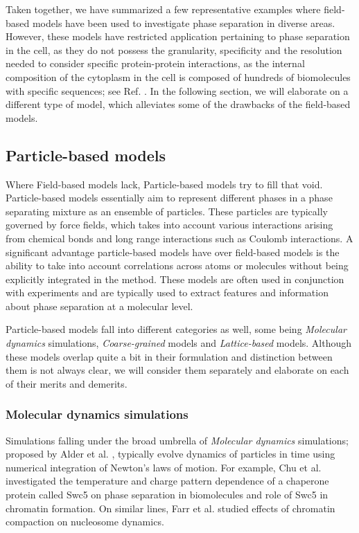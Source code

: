 Taken together, we have summarized a few representative examples where field-based models have been used to investigate phase separation in diverse areas. 
However, these models have restricted application pertaining to phase separation in the cell, as they do not possess the granularity, specificity and the resolution needed to consider specific protein-protein interactions, as the internal composition of the cytoplasm in the cell is composed of hundreds of biomolecules with specific sequences; see Ref. \cite{Burla2019}.
In the following section, we will elaborate on a different type of model, which alleviates some of the drawbacks of the field-based models. 

\subsection{Particle-based models}

Where Field-based models lack, Particle-based models try to fill that void.
Particle-based models essentially aim to represent different phases in a phase separating mixture as an ensemble of particles.
These particles are typically governed by force fields, which takes into account various interactions arising from chemical bonds and long range interactions such as Coulomb interactions.
A significant advantage particle-based models have over field-based models is the ability to take into account correlations across atoms or molecules without being explicitly integrated in the method.
These models are often used in conjunction with experiments and are typically used to extract features and information about phase separation at a molecular level.

Particle-based models fall into different categories as well, some being \textit{Molecular dynamics} simulations, \textit{Coarse-grained} models and \textit{Lattice-based} models.
Although these models overlap quite a bit in their formulation and distinction between them is not always clear, we will consider them separately and elaborate on each of their merits and demerits. 

\subsubsection{Molecular dynamics simulations}

Simulations falling under the broad umbrella of \textit{Molecular dynamics} simulations; proposed by Alder et al. \cite{Alder1959}, typically evolve dynamics of particles in time using numerical integration of Newton's laws of motion.
For example, Chu et al. \cite{Chu2021} investigated the temperature and charge pattern dependence of a chaperone protein called Swc5 on phase separation in biomolecules and role of Swc5 in chromatin formation.
On similar lines, Farr et al. \cite{Farr2021} studied effects of chromatin compaction on nucleosome dynamics.

